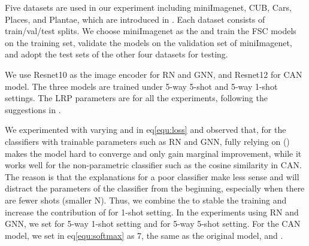 \documentclass[a4paper,conference]{IEEEtran}
\begin{document}
Five datasets are used in our experiment including miniImagenet\cite{miniImageNet:vinyals2016matching}, CUB\cite{CUB:wah2011caltech}, Cars\cite{Cars:krause20133d}, Places\cite{Places:zhou2017places}, and Plantae\cite{Plantae:van2018inaturalist}, which are introduced in \cite{FeaturewiseTranslayer:tseng2020cross}. Each dataset consists of train/val/test splits. We choose miniImagenet as the  and train the FSC models on the training set, validate the models on the validation set of miniImagenet, and adopt the test sets of the other four datasets for testing.

We use Resnet10\cite{Resnet:he2016deep} as the image encoder for RN and GNN, and Resnet12 for CAN model. The three models are trained under 5-way 5-shot and 5-way 1-shot settings.
The LRP parameters are  for all the experiments, following the suggestions in \cite{SebasIJCNN2020:kohlbrenner2019towards}.

We experimented with varying  and  in eq\eqref{equ:loss} and observed that, for the classifiers with trainable parameters such as RN and GNN, fully relying on  () makes the model hard to converge and only gain marginal improvement, while it works well for the non-parametric classifier such as the cosine similarity in CAN. The reason is that the explanations for a poor classifier make less sense and will distract the parameters of the classifier from the beginning, especially when there are fewer shots (smaller N). Thus, we combine the  to stable the training and increase the contribution of  for 1-shot setting. In the experiments using RN and GNN, we set  for 5-way 1-shot setting and  for 5-way 5-shot setting. For the CAN model, we set  in eq\eqref{equ:softmax} as 7, the same as the original model, and .
\end{document}
